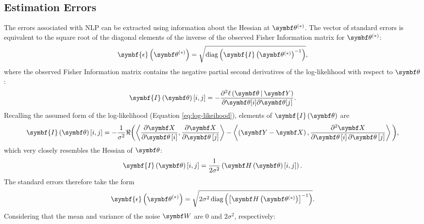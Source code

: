 \subsection{Estimation Errors}
\label{subsec:errors}
The errors associated with \ac{NLP} can be extracted using information about
the Hessian at $\bthstar$. The vector of standard errors is equivalent to the
square root of the diagonal elements of the inverse of the observed Fisher
Information matrix for $\bthstar$\cite[Section 2.7]{Pawitan2001}:
\begin{equation}
    \symbf{\epsilon}\left(\bthstar\right) = \sqrt{\diag\left(\symbf{I}\left( \bthstar \right)^{-1}\right)},
\end{equation}
where the observed Fisher Information matrix contains the negative partial second
derivatives of the log-likelihood with respect to $\bth$:
\begin{equation}
    \symbf{I}\left(\bth\right) [i, j] =
        -\frac
        {\partial^2 \ell \left( \bdthY \right)}
        {\partial \bth[i] \partial\bth[j]}.
\end{equation}
Recalling the assumed form of the log-likelihood (Equation
\ref{eq:log-likeihood}), elements of $\symbf{I}\left(\bth\right)$ are
\begin{equation}
    \symbf{I}\left(\bth\right) [i, j] =
        -\frac{1}{\sigma^2}
        \Re
        \biggl(
            \left\langle
                \frac{\partial \bX}{\partial \bth\left[i\right]},
                \frac{\partial \bX}{\partial \bth\left[j\right]}
            \right\rangle
            -
            \left\langle
                \left(\bY - \bX\right),
                \frac{\partial^2 \bX}{\partial \bth\left[i\right] \partial \bth\left[j\right]}
            \right\rangle
        \biggl),
\end{equation}
which very closely resembles the Hessian of $\bth$:
\begin{equation}
    \symbf{I}\left(\bth\right) [i, j] =
        \frac{1}{2 \sigma^2} \left(
            \bdHth[i,j]
        \right).
\end{equation}
The standard errors therefore take the form
\begin{equation}
    \symbf{\epsilon}\left(\bthstar\right) =
        \sqrt{
            2\sigma^2 \diag \left(
                \left[
                    \bdHthstar
                \right]^{-1}
            \right)
        }.
\end{equation}
Considering that the mean and variance of the noise $\bW$ are $0$ and $2\sigma^2$, respectively:
